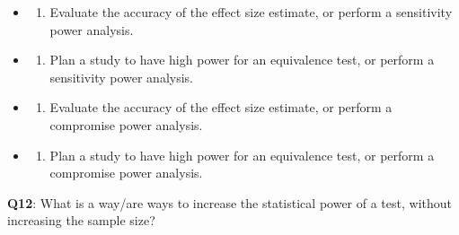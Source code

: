 \documentclass[
  letterpaper,
  DIV=11,
  numbers=noendperiod]{scrreprt}
\providecommand{\tightlist}{%
  \setlength{\itemsep}{0pt}\setlength{\parskip}{0pt}}\usepackage{longtable,booktabs,array}
\begin{document}
\begin{itemize}
\item
  \begin{enumerate}
  \def\labelenumi{(\Alph{enumi})}
  \tightlist
  \item
    Evaluate the accuracy of the effect size estimate, or perform a
    sensitivity power analysis.\\
  \end{enumerate}
\item
  \begin{enumerate}
  \def\labelenumi{(\Alph{enumi})}
  \setcounter{enumi}{1}
  \tightlist
  \item
    Plan a study to have high power for an equivalence test, or perform
    a sensitivity power analysis.\\
  \end{enumerate}
\item
  \begin{enumerate}
  \def\labelenumi{(\Alph{enumi})}
  \setcounter{enumi}{2}
  \tightlist
  \item
    Evaluate the accuracy of the effect size estimate, or perform a
    compromise power analysis.\\
  \end{enumerate}
\item
  \begin{enumerate}
  \def\labelenumi{(\Alph{enumi})}
  \setcounter{enumi}{3}
  \tightlist
  \item
    Plan a study to have high power for an equivalence test, or perform
    a compromise power analysis.\\
  \end{enumerate}
\end{itemize}

\textbf{Q12}: What is a way/are ways to increase the statistical power
of a test, without increasing the sample size?
\end{document}
